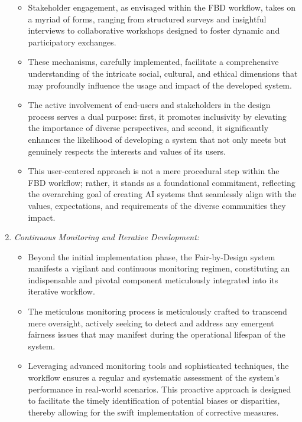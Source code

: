 \begin{enumerate}[label=\arabic*.]
\begin{itemize}
        \item Stakeholder engagement, as envisaged within the FBD workflow, takes on a myriad of forms, ranging from structured surveys and insightful interviews to collaborative workshops designed to foster dynamic and participatory exchanges.
    
        \item These mechanisms, carefully implemented, facilitate a comprehensive understanding of the intricate social, cultural, and ethical dimensions that may profoundly influence the usage and impact of the developed system.
    
        \item The active involvement of end-users and stakeholders in the design process serves a dual purpose: first, it promotes inclusivity by elevating the importance of diverse perspectives, and second, it significantly enhances the likelihood of developing a system that not only meets but genuinely respects the interests and values of its users.
    
        \item This user-centered approach is not a mere procedural step within the FBD workflow; rather, it stands as a foundational commitment, reflecting the overarching goal of creating AI systems that seamlessly align with the values, expectations, and requirements of the diverse communities they impact.
    
    \end{itemize}

    \item \emph{Continuous Monitoring and Iterative Development:}
    
    \begin{itemize}
     
        \item Beyond the initial implementation phase, the Fair-by-Design system manifests a vigilant and continuous monitoring regimen, constituting an indispensable and pivotal component meticulously integrated into its iterative workflow.
    
        \item The meticulous monitoring process is meticulously crafted to transcend mere oversight, actively seeking to detect and address any emergent fairness issues that may manifest during the operational lifespan of the system.
    
        \item Leveraging advanced monitoring tools and sophisticated techniques, the workflow ensures a regular and systematic assessment of the system's performance in real-world scenarios. This proactive approach is designed to facilitate the timely identification of potential biases or disparities, thereby allowing for the swift implementation of corrective measures.
    

\end{itemize}
\end{enumerate}
